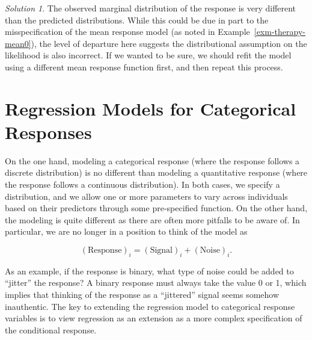 \documentclass[
  letterpaper,
  DIV=11,
  numbers=noendperiod]{scrreprt}
\theoremstyle{definition}
\theoremstyle{plain}
\theoremstyle{definition}
\theoremstyle{remark}
\newtheorem*{solution}{Solution}
\begin{document}
\begin{solution}

The observed marginal distribution of the response is very different
than the predicted distributions. While this could be due in part to the
misspecification of the mean response model (as noted in
Example~\ref{exm-therapy-mean0}), the level of departure here suggests
the distributional assumption on the likelihood is also incorrect. If we
wanted to be sure, we should refit the model using a different mean
response function first, and then repeat this process.

\end{solution}

\hypertarget{sec-discrete-responses}{%
\chapter{Regression Models for Categorical
Responses}\label{sec-discrete-responses}}

\providecommand{\norm}[1]{\lVert#1\rVert}
\providecommand{\abs}[1]{\lvert#1\rvert}
\providecommand{\iid}{\stackrel{\text{IID}}{\sim}}
\providecommand{\ind}{\stackrel{\text{Ind}}{\sim}}

\providecommand{\bm}[1]{\mathbf{#1}}
\providecommand{\bs}[1]{\boldsymbol{#1}}
\providecommand{\bbeta}{\bs{\beta}}

\providecommand{\Ell}{\mathcal{L}}
\providecommand{\indep}{\perp\negthickspace\negmedspace\perp}

On the one hand, modeling a categorical response (where the response
follows a discrete distribution) is no different than modeling a
quantitative response (where the response follows a continuous
distribution). In both cases, we specify a distribution, and we allow
one or more parameters to vary across individuals based on their
predictors through some pre-specified function. On the other hand, the
modeling is quite different as there are often more pitfalls to be aware
of. In particular, we are no longer in a position to think of the model
as

\[(\text{Response})_i = (\text{Signal})_i + (\text{Noise})_i.\]

As an example, if the response is binary, what type of noise could be
added to ``jitter'' the response? A binary response must always take the
value 0 or 1, which implies that thinking of the response as a
``jittered'' signal seems somehow inauthentic. The key to extending the
regression model to categorical response variables is to view regression
as an extension as a more complex specification of the conditional
response.
\end{document}
